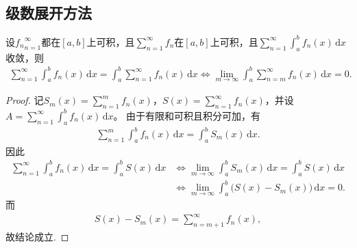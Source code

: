 \documentclass[../../main.tex]{subfiles}%
\begin{document}
\subsection{级数展开方法}

\begin{proposition}[级数逐项可积等价于余项趋于0]\label{proposition:级数逐项可积等价于余项趋于0}
设${f_n}_{n=1}^{\infty}$都在$[a,b]$上可积，且$\sum\limits_{n=1}^{\infty} f_n$在$[a,b]$上可积，且$\sum\limits_{n=1}^{\infty}\int_a^b f_n(x)\,\mathrm{d}x$收敛，则
\begin{align*}
\sum_{n=1}^{\infty}\int_a^b f_n(x)\,\mathrm{d}x
= \int_a^b \sum_{n=1}^{\infty} f_n(x)\,\mathrm{d}x\iff \lim_{m\to\infty}\int_a^b \sum_{n=m}^{\infty} f_n(x)\,\mathrm{d}x = 0.
\end{align*}
\end{proposition}
\begin{proof}
记$S_m(x)=\sum\limits_{n=1}^{m} f_n(x)$，$S(x)=\sum\limits_{n=1}^{\infty} f_n(x)$，并设$A=\sum\limits_{n=1}^{\infty}\int_a^b f_n(x)\,\mathrm{d}x$。
由于有限和可积且积分可加，有
\begin{align*}
\sum_{n=1}^{m}\int_a^b f_n(x)\,\mathrm{d}x
= \int_a^b S_m(x)\,\mathrm{d}x.
\end{align*}
因此
\begin{align*}
\sum_{n=1}^{\infty}\int_a^b f_n(x)\,\mathrm{d}x
= \int_a^b S(x)\,\mathrm{d}x
&\Longleftrightarrow
\lim_{m\to\infty}\int_a^b S_m(x)\,\mathrm{d}x
= \int_a^b S(x)\,\mathrm{d}x \\
&\Longleftrightarrow
\lim_{m\to\infty}\int_a^b \bigl(S(x)-S_m(x)\bigr)\,\mathrm{d}x = 0.
\end{align*}
而
\begin{align*}
S(x)-S_m(x)=\sum_{n=m+1}^{\infty} f_n(x),
\end{align*}
故结论成立.
\end{proof}
\end{document}
